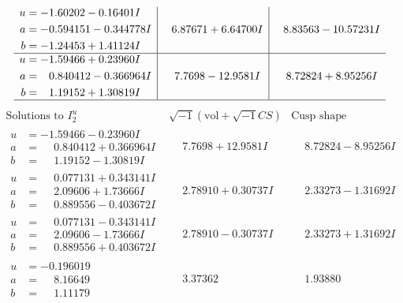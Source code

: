 \documentclass[1p]{elsarticle_modified}
\theoremstyle{definition}
\newcommand{\I}{\sqrt{-1}}
\begin{document}
$$\begin{array}{c|c|c}
\begin{aligned}
u &= -1.60202 - 0.16401 I \\
a &= -0.594151 - 0.344778 I \\
b &= -1.24453 + 1.41124 I\end{aligned}
 & \phantom{-}6.87671 + 6.64700 I & \phantom{-}8.83563 - 10.57231 I \\ \hline\begin{aligned}
u &= -1.59466 + 0.23960 I \\
a &= \phantom{-}0.840412 - 0.366964 I \\
b &= \phantom{-}1.19152 + 1.30819 I\end{aligned}
 & \phantom{-}7.7698 - 12.9581 I & \phantom{-}8.72824 + 8.95256 I\\
 \hline 
 \end{array}$$\newpage$$\begin{array}{c|c|c}  
\text{Solutions to }I^u_{2}& \I (\text{vol} + \sqrt{-1}CS) & \text{Cusp shape}\\
 \hline 
\begin{aligned}
u &= -1.59466 - 0.23960 I \\
a &= \phantom{-}0.840412 + 0.366964 I \\
b &= \phantom{-}1.19152 - 1.30819 I\end{aligned}
 & \phantom{-}7.7698 + 12.9581 I & \phantom{-}8.72824 - 8.95256 I \\ \hline\begin{aligned}
u &= \phantom{-}0.077131 + 0.343141 I \\
a &= \phantom{-}2.09606 + 1.73666 I \\
b &= \phantom{-}0.889556 - 0.403672 I\end{aligned}
 & \phantom{-}2.78910 + 0.30737 I & \phantom{-}2.33273 - 1.31692 I \\ \hline\begin{aligned}
u &= \phantom{-}0.077131 - 0.343141 I \\
a &= \phantom{-}2.09606 - 1.73666 I \\
b &= \phantom{-}0.889556 + 0.403672 I\end{aligned}
 & \phantom{-}2.78910 - 0.30737 I & \phantom{-}2.33273 + 1.31692 I \\ \hline\begin{aligned}
u &= -0.196019\phantom{ +0.000000I} \\
a &= \phantom{-}8.16649\phantom{ +0.000000I} \\
b &= \phantom{-}1.11179\phantom{ +0.000000I}\end{aligned}
 & \phantom{-}3.37362\phantom{ +0.000000I} & \phantom{-}1.93880\phantom{ +0.000000I} \\ \hline\begin{aligned}

\end{aligned}
\end{array}$$
\end{document}
